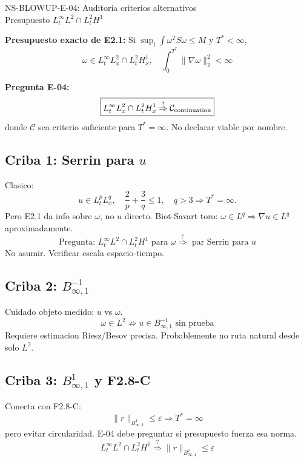 \documentclass[11pt]{article}
\begin{document}
\begin{center}
{\Large NS-BLOWUP-E-04: Auditoria criterios alternativos}\\
Presupuesto $L^\infty_tL^2\cap L^2_tH^1$
\end{center}

\textbf{Presupuesto exacto de E2.1:} Si $\sup_t\int\omega^T S\omega\le M$ y $T^*<\infty$,
\[
\boxed{\omega\in L^\infty_tL^2_x\cap L^2_tH^1_x,\quad \int_0^{T^*}\|\nabla\omega\|_2^2<\infty}
\]

\textbf{Pregunta E-04:}
\[
\boxed{L^\infty_tL^2_x\cap L^2_tH^1_x \stackrel{?}{\Rightarrow} \mathcal C_{\rm continuation}}
\]
donde $\mathcal C$ sea criterio suficiente para $T^*=\infty$. No declarar viable por nombre.

\subsection*{Criba 1: Serrin para $u$}
Clasico:
\[
u\in L^p_tL^q_x,\quad \frac2p+\frac3q\le1,\quad q>3 \Rightarrow T^*=\infty.
\]
Pero E2.1 da info sobre $\omega$, no $u$ directo.
Biot-Savart toro: $\omega\in L^q\Rightarrow\nabla u\in L^q$ aproximadamente.
\[
\boxed{\text{Pregunta: }L^\infty_tL^2\cap L^2_tH^1\text{ para }\omega\stackrel{?}{\Rightarrow}\text{ par Serrin para }u}
\]
No asumir. Verificar escala espacio-tiempo.

\subsection*{Criba 2: $B^{-1}_{\infty,1}$}
Cuidado objeto medido: $u$ vs $\omega$.
\[
\boxed{\omega\in L^2\not\Rightarrow u\in B^{-1}_{\infty,1}\text{ sin prueba}}
\]
Requiere estimacion Riesz/Besov precisa. Probablemente no ruta natural desde solo $L^2$.

\subsection*{Criba 3: $B^1_{\infty,1}$ y F2.8-C}
Conecta con F2.8-C:
\[
\|r\|_{B^1_{\infty,1}}\le\varepsilon\Rightarrow T^*=\infty
\]
pero evitar circularidad. E-04 debe preguntar si presupuesto fuerza esa norma.
\[
\boxed{L^\infty_tL^2\cap L^2_tH^1\stackrel{?}{\Rightarrow}\|r\|_{B^1_{\infty,1}}\le\varepsilon}
\]
\end{document}
